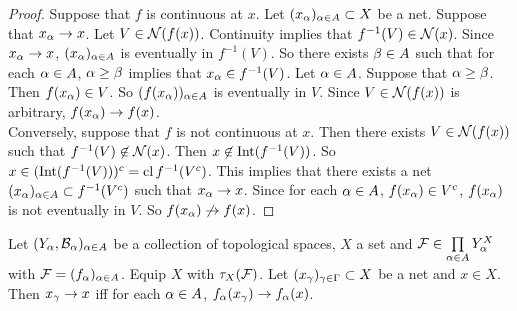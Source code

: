 \documentclass{book}
\begin{document}
	\begin{proof}
	Suppose that $f$ is continuous at $x$. Let $(x_{\alpha})_{\alpha \in A} \subset X$ be a net. Suppose that $x_{\alpha} \rightarrow x$. Let $V \in \mathcal{N}(f(x))$. Continuity implies that $f^{-1}(V) \in \mathcal{N}(x)$. Since  $x_{\alpha} \rightarrow x$, $(x_{\alpha})_{\alpha \in A}$ is eventually in $f^{-1}(V)$. So there exists $\beta \in A$ such that for each $\alpha \in A$, $\alpha \geq \beta$ implies that $x_{\alpha} \in f^{-1}(V)$. Let $\alpha \in A$. Suppose that $\alpha \geq \beta$. Then $f(x_{\alpha}) \in V$. So $(f(x_{\alpha}))_{\alpha \in A}$ is eventually in $V$. Since $V \in \mathcal{N}(f(x))$ is arbitrary, $f(x_{\alpha}) \rightarrow f(x)$.\\
	Conversely, suppose that $f$ is not continuous at $x$. Then there exists $V \in \mathcal{N}(f(x))$ such that $f^{-1}(V) \not \in \mathcal{N}(x)$. Then $x \not \in \operatorname{Int} (f^{-1}(V))$. So $x \in (\operatorname{Int} (f^{-1}(V)))^c = \operatorname{cl} f^{-1}(V^c)$. This implies that there exists a net $(x_{\alpha})_{\alpha \in A} \subset f^{-1}(V^c)$ such that $x_{\alpha} \rightarrow x$. Since for each $\alpha \in A$, $f(x_{\alpha}) \in V^c$, $f(x_{\alpha})$ is not eventually in $V$. So $f(x_{\alpha}) \not \rightarrow f(x)$. 
\end{proof}		
	
	\begin{ex} 
	Let $(Y_{\alpha}, \mathcal{B}_{\alpha})_{\alpha \in A}$ be a collection of topological spaces, $X$ a set and $\mathcal{F} \in \prod \limits_{\alpha \in A}Y_{\alpha}^X$ with $\mathcal{F} = (f_{\alpha})_{\alpha \in A}$. Equip $X$ with $\tau_X(\mathcal{F})$. Let $(x_{\gamma})_{\gamma \in \Gamma} \subset X$ be a net and $x \in X$. Then $x_{\gamma} \rightarrow x$ iff for each $\alpha \in A$, $f_{\alpha}(x_{\gamma}) \rightarrow f_{\alpha}(x)$.  
	\end{ex}
	
\end{document}
